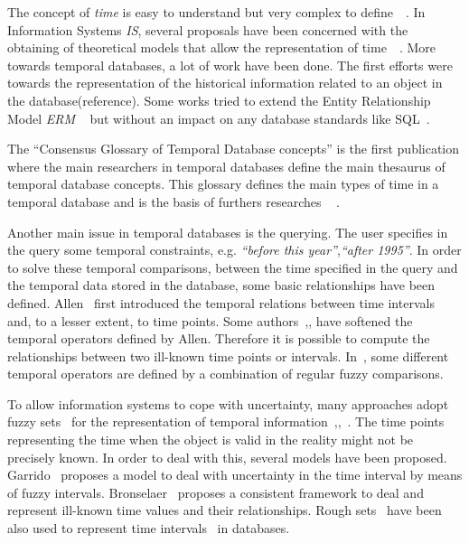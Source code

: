 %
%
The concept of \emph{time} is easy to understand but very complex to define~\cite{klein94}~\cite{Shackle61}. 
In Information Systems \emph{IS}, several proposals have been concerned with the obtaining of theoretical models that allow the representation of time~\cite{Bolour82}~\cite{Cru97}. 
More towards temporal databases, a lot of work have been done. The first efforts were towards the representation of the historical information related to an object in the database(reference). Some works tried to extend the Entity Relationship Model \emph{ERM} ~\cite{Klopprogge:1983} but without an impact on any database standards like SQL~\cite{Sarda:1990:ESH:627277.627409}.

The ``Consensus Glossary of Temporal Database concepts'' \cite{Dyreson1994} is the first publication where the main researchers in temporal databases define the main thesaurus of temporal database concepts. This glossary defines the main types of time in a temporal database and is the basis of furthers researches ~\cite{Sarda:1990:ESH:627277.627409} \cite{Jensen94thetsql2}.

Another main issue in temporal databases is the querying. The user specifies in the query some temporal constraints, e.g. \emph{``before this year''},\emph{``after 1995''}. In order to solve these temporal comparisons, between the time specified in the query and the temporal data stored in the database, some basic relationships have been defined. Allen~\cite{Allen83} first introduced the temporal relations between time intervals and, to a lesser extent, to time points. Some authors~\cite{ohlbach2004},\cite{nagypal2003},\cite{schockaert08} have softened the temporal operators defined by Allen. Therefore it is possible to compute the relationships between two ill-known time points or intervals. In~\cite{garrido2009}, some different temporal operators are defined by a combination of regular fuzzy comparisons. %

To allow information systems to cope with uncertainty, many approaches adopt fuzzy sets~\cite{Zadeh65} for the representation of temporal information~\cite{Billiet:Pons:Matthe:DeTre:Pons:2011:BipolarFuzzy},\cite{Dubois:jucs_9_9:fuzziness_and_uncertainty_in},~\cite{devos94}. The time points representing the time when the object is valid in the reality might not be precisely known. In order to deal with this, several models have been proposed. Garrido~\cite{garrido2009} proposes a model to deal with uncertainty in the time interval by means of fuzzy intervals. Bronselaer~\cite{Pon11} proposes a consistent framework to deal and represent ill-known time values and their relationships. Rough sets~\cite{Pawlak1995} have been also used to represent time intervals~\cite{Qia09} in databases.

